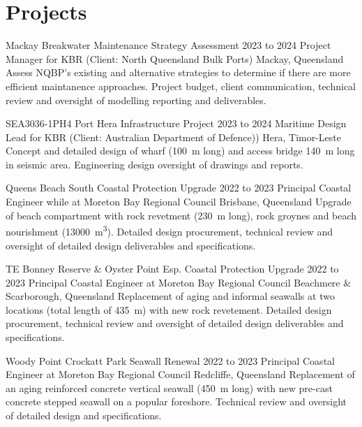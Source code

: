 \section{Projects}


	\entrytableproject%
	{Mackay Breakwater Maintenance Strategy Assessment}
	{2023 to 2024}
	{}
	{Project Manager for KBR (Client: North Queensland Bulk Ports)}
	{Mackay, Queensland}
	{Assess NQBP's existing and alternative strategies to determine if there are more efficient maintanence approaches.}
	{Project budget, client communication, technical review and oversight of modelling reporting and deliverables.}

	\entrytableproject%
	{SEA3036-1PH4 Port Hera Infrastructure Project}
	{2023 to 2024}
	{}
	{Maritime Design Lead for KBR (Client: Australian Department of Defence))}
	{Hera, Timor-Leste}
	{Concept and detailed design of wharf (\SI{100}{\m} long) and access bridge {\SI{140}{\m} long in seismic area.}}
	{Engineering design oversight of drawings and reports.}

	\entrytableproject%
	{Queens Beach South Coastal Protection Upgrade}
	{2022 to 2023}
	{}
	{Principal Coastal Engineer while at Moreton Bay Regional Council}
	{Brisbane, Queensland}
	{Upgrade of beach compartment with rock revetment (\SI{230}{\m} long), rock groynes and beach nourishment (\SI{13000}{\m\cubed}).}
	{Detailed design procurement, technical review and oversight of detailed design deliverables and specifications.}
	
	\entrytableproject%
	{TE Bonney Reserve \& Oyster Point Esp. Coastal Protection Upgrade}
	{2022 to 2023}
	{}
	{Principal Coastal Engineer at Moreton Bay Regional Council}
	{Beachmere \& Scarborough, Queensland}
	{Replacement of aging and informal seawalls at two locations (total length of \SI{435}{\m}) with new rock revetement.}
	{Detailed design procurement, technical review and oversight of detailed design deliverables and specifications.}

	\entrytableproject%
	{Woody Point Crockatt Park Seawall Renewal}
	{2022 to 2023}
	{}
	{Principal Coastal Engineer at Moreton Bay Regional Council}
	{Redcliffe, Queensland}
	{Replacement of an aging reinforced concrete vertical seawall (\SI{450}{\m} long) with new pre-cast concrete stepped seawall on a popular foreshore.}
	{Technical review and oversight of detailed design and specifications.}

